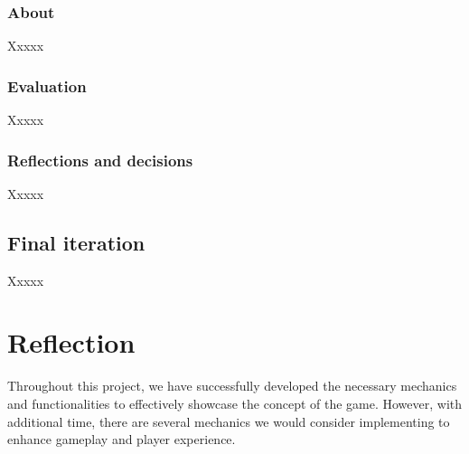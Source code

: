 \documentclass[conference]{IEEEtran}
\begin{document}
    \subsubsection{About}
    Xxxxx

    \subsubsection{Evaluation}
    Xxxxx

    \subsubsection{Reflections and decisions}
    Xxxxx

    \subsection{Final iteration}
    Xxxxx


    \section{Reflection}


    Throughout this project, we have successfully developed the necessary mechanics and functionalities to effectively showcase the concept of the game.
    However, with additional time, there are several mechanics we would consider implementing to enhance gameplay and player experience.
\end{document}
